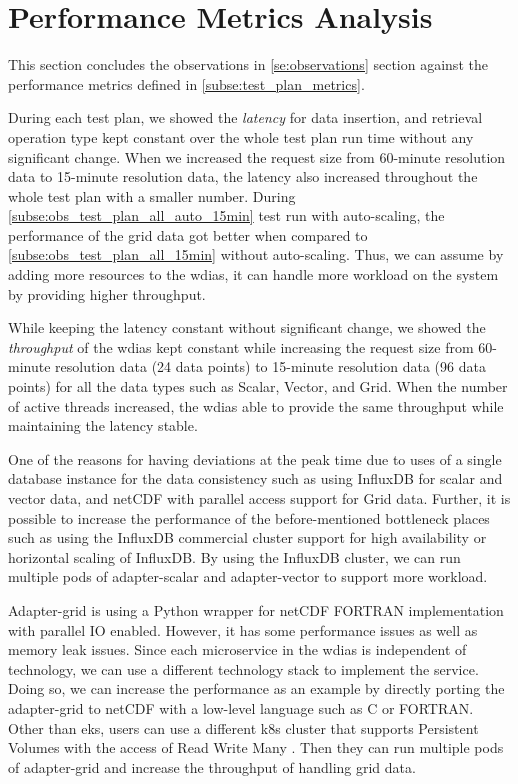 \section{Performance Metrics Analysis}
\label{se:discussion}

This section concludes the observations in \cref{se:observations} section against the performance metrics defined in \cref{subse:test_plan_metrics}.

During each test plan, we showed the \emph{latency} for data insertion, and retrieval operation type kept constant over the whole test plan run time without any significant change. When we increased the request size from 60-minute resolution data to 15-minute resolution data, the latency also increased throughout the whole test plan with a smaller number.
During \cref{subse:obs_test_plan_all_auto_15min} test run with auto-scaling, the performance of the grid data got better when compared to \cref{subse:obs_test_plan_all_15min} without auto-scaling. Thus, we can assume by adding more resources to the \acrshort{wdias}, it can handle more workload on the system by providing higher throughput.

While keeping the latency constant without significant change, we showed the \emph{throughput} of the \acrshort{wdias} kept constant while increasing the request size from 60-minute resolution data (24 data points) to 15-minute resolution data (96 data points) for all the data types such as Scalar, Vector, and Grid. When the number of active threads increased, the \acrshort{wdias} able to provide the same throughput while maintaining the latency stable.

One of the reasons for having deviations at the peak time due to uses of a single database instance for the data consistency such as using InfluxDB for scalar and vector data, and netCDF with parallel access support for Grid data. Further, it is possible to increase the performance of the before-mentioned bottleneck places such as using the InfluxDB commercial cluster support for high availability or horizontal scaling of InfluxDB. By using the InfluxDB cluster, we can run multiple pods of adapter-scalar and adapter-vector to support more workload.

Adapter-grid is using a Python wrapper for netCDF FORTRAN implementation with parallel IO enabled. However, it has some performance issues as well as memory leak issues. Since each microservice in the \acrshort{wdias} is independent of technology, we can use a different technology stack to implement the service. Doing so, we can increase the performance as an example by directly porting the adapter-grid to netCDF with a low-level language such as C or FORTRAN. Other than \acrshort{eks}, users can use a different \acrshort{k8s} cluster that supports Persistent Volumes with the access of Read Write Many \cite{LinuxFoundationPersistentKubernetes}. Then they can run multiple pods of adapter-grid and increase the throughput of handling grid data.

